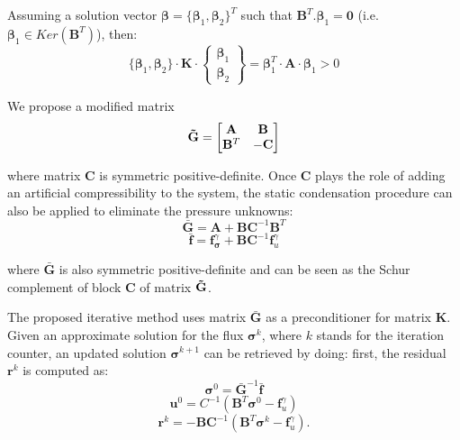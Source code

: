 \documentclass{wccm2024}
\begin{document}
Assuming a solution vector $\boldsymbol{\beta}=\{\boldsymbol{\beta}_1, \boldsymbol{\beta}_2\}^T$ such that $\mathbf{B}^T . \boldsymbol{\beta}_1 = \mathbf{0}$ (i.e. $\boldsymbol{\beta}_1 \in Ker\left( \mathbf{B}^T \right)$), then:
\vskip -0.3cm
\begin{equation}
    \{\boldsymbol{\beta}_1, \boldsymbol{\beta}_2\} \cdot \mathbf{K} \cdot 
    \begin{Bmatrix}
        \boldsymbol{\beta}_1 \\
        \boldsymbol{\beta}_2
    \end{Bmatrix}
    = \boldsymbol{\beta}_1^T \cdot \mathbf{A} \cdot \boldsymbol{\beta}_1 > 0
\end{equation}

We propose a modified matrix
\vskip -0.3cm
\begin{equation}
    \mathbf{\Tilde{G}} =
    \begin{bmatrix}
        \mathbf{A} & \mathbf{B} \\
        \mathbf{B}^T & -\mathbf{C}
    \end{bmatrix}
\end{equation}

\noindent where matrix $\mathbf{C}$ is symmetric positive-definite. Once $\mathbf{C}$ plays the role of adding an artificial compressibility to the system, the static condensation procedure can also be applied to eliminate the pressure unknowns:
\vskip -0.3cm
\begin{equation}
    \bar{\mathbf{G}} = \mathbf{A} + \mathbf{B}\mathbf{C}^{-1}\mathbf{B}^T
\end{equation}
\vskip -0.3cm
\begin{equation}
    \bar{\mathbf{f}} = \mathbf{f}^\gamma_{\boldsymbol{\sigma}} + \mathbf{B}\mathbf{C}^{-1}\mathbf{f}^\gamma_{u}
\end{equation}

\noindent where $\bar{\mathbf{G}}$ is also symmetric positive-definite and can be seen as the Schur complement of block $\mathbf{C}$ of matrix $\mathbf{\Tilde{G}}$. 

The proposed iterative method uses matrix $\bar{\mathbf{G}}$ as a preconditioner for matrix $\mathbf{K}$. Given an approximate solution for the flux $\boldsymbol{\sigma}^k$, where $k$ stands for the iteration counter, an updated solution $\boldsymbol{\sigma}^{k+1}$ can be retrieved by doing: first, the residual $\mathbf{r}^{k}$ is computed as:
\begin{equation}
\boldsymbol{\sigma}^0 = \bar{\mathbf{G}}^{-1}\bar{\mathbf{f}}
\end{equation}
\begin{equation}
\mathbf{u}^0 = C^{-1}\left(\mathbf{B}^T \boldsymbol{\sigma}^0-\mathbf{f}_u^\gamma\right)
\end{equation}
\vskip -0.3cm
\begin{equation}
    \mathbf{r}^{k} = - \mathbf{B}\mathbf{C}^{-1}\left(\mathbf{B}^T \boldsymbol{\sigma}^k-\mathbf{f}_u^\gamma \right) .
\end{equation}
\end{document}
